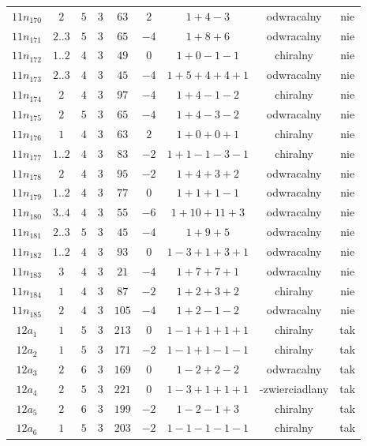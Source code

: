 \begin{longtable}{ccccccccc}
$11n_{170}$ & $2$ & $5$ & $3$ & $63$ & $2$ & $1+4-3$ & odwracalny & nie \\
$11n_{171}$ & $2..3$ & $5$ & $3$ & $65$ & $-4$ & $1+8+6$ & odwracalny & nie \\
$11n_{172}$ & $1..2$ & $4$ & $3$ & $49$ & $0$ & $1+0-1-1$ & chiralny & nie \\
$11n_{173}$ & $2..3$ & $4$ & $3$ & $45$ & $-4$ & $1+5+4+4+1$ & odwracalny & nie \\
$11n_{174}$ & $2$ & $4$ & $3$ & $97$ & $-4$ & $1+4-1-2$ & chiralny & nie \\
$11n_{175}$ & $2$ & $5$ & $3$ & $65$ & $-4$ & $1+4-3-2$ & odwracalny & nie \\
$11n_{176}$ & $1$ & $4$ & $3$ & $63$ & $2$ & $1+0+0+1$ & chiralny & nie \\
$11n_{177}$ & $1..2$ & $4$ & $3$ & $83$ & $-2$ & $1+1-1-3-1$ & chiralny & nie \\
$11n_{178}$ & $2$ & $4$ & $3$ & $95$ & $-2$ & $1+4+3+2$ & odwracalny & nie \\
$11n_{179}$ & $1..2$ & $4$ & $3$ & $77$ & $0$ & $1+1+1-1$ & odwracalny & nie \\
$11n_{180}$ & $3..4$ & $4$ & $3$ & $55$ & $-6$ & $1+10+11+3$ & odwracalny & nie \\
$11n_{181}$ & $2..3$ & $5$ & $3$ & $45$ & $-4$ & $1+9+5$ & odwracalny & nie \\
$11n_{182}$ & $1..2$ & $4$ & $3$ & $93$ & $0$ & $1-3+1+3+1$ & odwracalny & nie \\
$11n_{183}$ & $3$ & $4$ & $3$ & $21$ & $-4$ & $1+7+7+1$ & odwracalny & nie \\
$11n_{184}$ & $1$ & $4$ & $3$ & $87$ & $-2$ & $1+2+3+2$ & chiralny & nie \\
$11n_{185}$ & $2$ & $4$ & $3$ & $105$ & $-4$ & $1+2-1-2$ & odwracalny & nie \\
$12a_{1}$ & $1$ & $5$ & $3$ & $213$ & $0$ & $1-1+1+1+1$ & chiralny & tak \\
$12a_{2}$ & $1$ & $5$ & $3$ & $171$ & $-2$ & $1-1+1-1-1$ & chiralny & tak \\
$12a_{3}$ & $2$ & $6$ & $3$ & $169$ & $0$ & $1-2+2-2$ & odwracalny & tak \\
$12a_{4}$ & $2$ & $5$ & $3$ & $221$ & $0$ & $1-3+1+1+1$ & -zwierciadlany & tak \\
$12a_{5}$ & $2$ & $6$ & $3$ & $199$ & $-2$ & $1-2-1+3$ & chiralny & tak \\
$12a_{6}$ & $1$ & $5$ & $3$ & $203$ & $-2$ & $1-1-1-1-1$ & chiralny & tak \\

\end{longtable}
